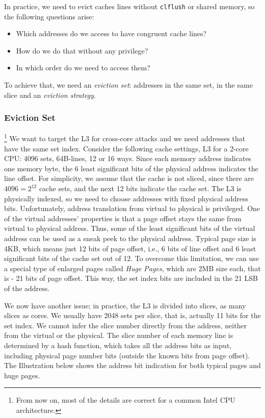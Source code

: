 In practice, we need to evict caches lines without \texttt{clflush} or shared
memory, so the following questions arise:
\begin{itemize}
    \item Which addresses do we access to have congruent cache lines?
    \item How do we do that without any privilege?
    \item In which order do we need to access them?
\end{itemize}
To achieve that, we need an \textit{eviction set}: addresses in the same set, in the same slice and an \textit{eviction strategy}.

\subsubsection{Eviction Set}
\label{subsubsec:evictionset}
\footnote{From now on, most of the details are correct for a common Intel CPU architecture.}
We want to target the L3 for cross-core attacks and we need addresses that have the same set index. Consider the following cache settings, L3 for a 2-core CPU: 4096 sets, 64B-lines, 12 or 16 ways. Since each memory address indicates one memory byte, the 6 least significant bits of the physical address indicates the line offset. For simplicity, we assume that the cache is not sliced, since there are $4096=2^{12}$ cache sets, and the next 12 bits indicate the cache set. The L3 is physically indexed, so we need to choose addresses with fixed physical address bits. Unfortunately, address translation from virtual to physical is privileged. One of the virtual addresses' properties is that a page offset stays the same from virtual to physical address. Thus, some of the least significant bits of the virtual address can be used as a sneak peek to the physical address. Typical page size is 4KB, which means just 12 bits of page offset, i.e., 6 bits of line offset and 6 least significant bits of the cache set out of 12. To overcome this limitation, we can use a special type of enlarged pages called \textit{Huge Pages}, which are 2MB size each, that is - 21 bits of page offset. This way, the set index bits are included in the 21 LSB of the address. 

We now have another issue; in practice, the L3 is divided into slices, as many slices as cores. We usually have 2048 sets per slice, that is, actually 11 bits for the set index. We cannot infer the slice number directly from the address, neither from the virtual or the physical. The slice number of each memory line is determined by a hash function, which takes all the address bits as input, including physical page number bits (outside the known bits from page offset). The Illustration below shows the address bit indication for both typical pages and huge pages.


